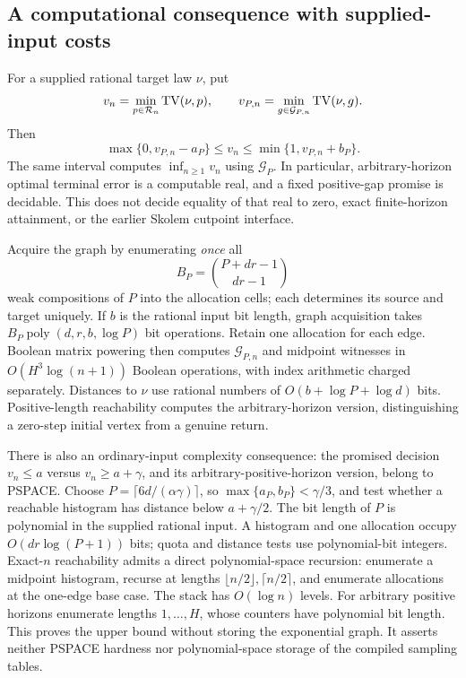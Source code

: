 \documentclass[11pt]{article}
\begin{document}
\subsection{A computational consequence with supplied-input costs}

For a supplied rational target law $\nu$, put
\[
v_n=\min_{p\in\mathcal R_n}{\rm TV}(\nu,p),\qquad
v_{P,n}=\min_{g\in\mathcal G_{P,n}}{\rm TV}(\nu,g).
\]
Then
\[
\max\{0,v_{P,n}-a_P\}\le v_n\le\min\{1,v_{P,n}+b_P\}.
\tag{C5}
\]
The same interval computes $\inf_{n\ge1}v_n$ using $\mathcal G_P$. In particular, arbitrary-horizon optimal terminal error is a computable real, and a fixed positive-gap promise is decidable. This does not decide equality of that real to zero, exact finite-horizon attainment, or the earlier Skolem cutpoint interface.

Acquire the graph by enumerating \emph{once} all
\[
B_P=\binom{P+dr-1}{dr-1}
\]
weak compositions of $P$ into the allocation cells; each determines its source and target uniquely. If $b$ is the rational input bit length, graph acquisition takes $B_P\operatorname{poly}(d,r,b,\log P)$ bit operations. Retain one allocation for each edge. Boolean matrix powering then computes $\mathcal G_{P,n}$ and midpoint witnesses in $O(H^3\log(n+1))$ Boolean operations, with index arithmetic charged separately. Distances to $\nu$ use rational numbers of $O(b+\log P+\log d)$ bits. Positive-length reachability computes the arbitrary-horizon version, distinguishing a zero-step initial vertex from a genuine return.

There is also an ordinary-input complexity consequence: the promised decision $v_n\le a$ versus $v_n\ge a+\gamma$, and its arbitrary-positive-horizon version, belong to PSPACE. Choose $P=\lceil6d/(\alpha\gamma)\rceil$, so $\max\{a_P,b_P\}<\gamma/3$, and test whether a reachable histogram has distance below $a+\gamma/2$. The bit length of $P$ is polynomial in the supplied rational input. A histogram and one allocation occupy $O(dr\log(P+1))$ bits; quota and distance tests use polynomial-bit integers. Exact-$n$ reachability admits a direct polynomial-space recursion: enumerate a midpoint histogram, recurse at lengths $\lfloor n/2\rfloor,\lceil n/2\rceil$, and enumerate allocations at the one-edge base case. The stack has $O(\log n)$ levels. For arbitrary positive horizons enumerate lengths $1,\ldots,H$, whose counters have polynomial bit length. This proves the upper bound without storing the exponential graph. It asserts neither PSPACE hardness nor polynomial-space storage of the compiled sampling tables.
\end{document}
